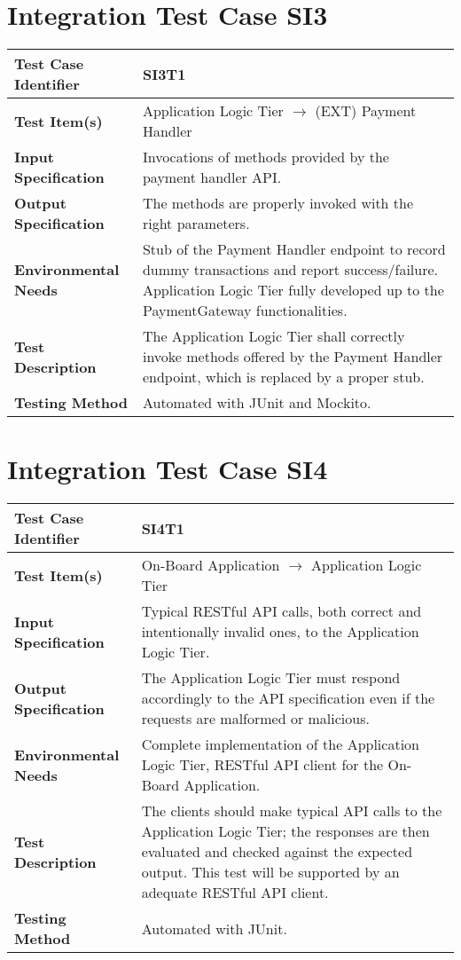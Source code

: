\section{Integration Test Case SI3}

\begin{longtable}{p{} | p{}}
\hline
\textbf{Test Case Identifier} & SI3T1\\
\hline
\textbf{Test Item(s)} & Application Logic Tier $\rightarrow$ (EXT) Payment Handler \\
\hline
\textbf{Input Specification} & Invocations of methods provided by the payment handler API. \\
\hline
\textbf{Output Specification} & The methods are properly invoked with the right parameters. \\
\hline
\textbf{Environmental Needs} & Stub of the Payment Handler endpoint to record dummy transactions and report success/failure. Application Logic Tier fully developed up to the PaymentGateway functionalities.\\
\hline
\textbf{Test Description} & The Application Logic Tier shall correctly invoke methods offered by the Payment Handler endpoint, which is replaced by a proper stub. \\
\hline
\textbf{Testing Method} & Automated with JUnit and Mockito. \\
\hline
\end{longtable}

\section{Integration Test Case SI4}

\begin{longtable}{p{} | p{}}
\hline
\textbf{Test Case Identifier} & SI4T1\\
\hline
\textbf{Test Item(s)} & On-Board Application $\rightarrow$ Application Logic Tier \\
\hline
\textbf{Input Specification} & Typical RESTful API calls, both correct and intentionally invalid ones, to the Application Logic Tier. \\
\hline
\textbf{Output Specification} & The Application Logic Tier must respond accordingly to the API specification even if the requests are malformed or malicious. \\
\hline
\textbf{Environmental Needs} & Complete implementation of the Application Logic Tier, RESTful API client for the On-Board Application. \\
\hline
\textbf{Test Description} & The clients should make typical API calls to the Application Logic Tier; the responses are then evaluated and checked against the expected output. This test will be supported by an adequate RESTful API client. \\
\hline
\textbf{Testing Method} & Automated with JUnit. \\
\hline
\end{longtable}

